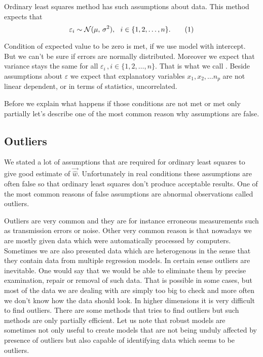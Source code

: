 Ordinary least squares method has such assumptions about data. This method expects that
\begin{equation}
    \varepsilon_i \sim \mathcal{N}(\mu,\,\sigma^{2})\\, \ \ i \in \{{1,2,\ldots,n\}}. \numberthis
\end{equation}

Condition of expected value to be zero is met, if we use model with intercept. But we can't be sure if errors are normally distributed. Moreover we expect that variance stays the same for all $\varepsilon_i\,, i \in \{{1,2,\ldots,n\}}$. That is what we call . Beside assumptions about $\varepsilon$ we expect that explanatory variables $x_1,x_2,\ldots n_p$ are not linear dependent, or in terms of statistics, uncorrelated.

Before we explain what happens if those conditions are not met or met only partially let's describe one of the most common reason why assumptions are false.

\subsection{Outliers}
We stated a lot of assumptions that are required for ordinary least squares to give 
good estimate of $\vec{\hat{w}}$. Unfortunately in  real conditions these assumptions are often false so that ordinary least squares don't produce acceptable results. One of the most common reasons of false assumptions are abnormal observations called outliers.

Outliers are very common and they are for instance erroneous measurements such as transmission errors or noise. Other very common reason is that nowadays we are mostly given data which were automatically processed by computers. Sometimes we are also presented data which are heterogenous in the sense  that they contain data from multiple regression models. In certain sense outliers are inevitable. One would say that we would be able to eliminate them by precise examination, repair or removal of such data. That is possible in some cases, but most of the data we are dealing with are simply too big to check and more often we don't know how the data should look. In higher dimensions it is very difficult to find outliers. There are some methods that tries to find outliers but such methods are only partially efficient. Let us note that robust models are sometimes not only useful to create models that are not being unduly affected by presence of outliers but also capable of identifying data which seems to be outliers. 

